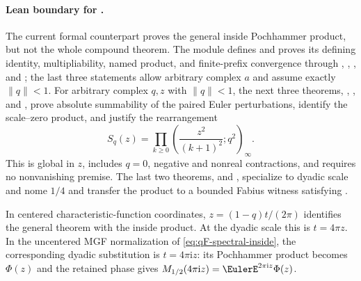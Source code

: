 \documentclass[11pt,a4paper,oneside,openany]{book}
\theoremstyle{definition}
\theoremstyle{remark}
\begin{document}
\paragraph{Lean boundary for .}
The current formal counterpart proves the general inside Pochhammer product,
but not the whole compound theorem.  The module
 defines
 and proves its defining identity,
multipliability, named product, and finite-prefix convergence through
,
,
, and
; the last three statements allow
arbitrary complex $a$ and assume exactly $\lVert q\rVert<1$.
For arbitrary complex $q,z$ with $\lVert q\rVert<1$, the next three theorems,
,
, and
, prove absolute
summability of the paired Euler perturbations, identify the scale--zero
product, and justify the rearrangement
\[
 S_q(z)=\prod_{k\ge0}
 \left(\frac{z^2}{(k+1)^2};q^2\right)_{\!\infty}.
\]
This is global in $z$, includes $q=0$, negative and nonreal contractions, and
requires no nonvanishing premise.  The last two theorems,
 and
, specialize to dyadic
scale and nome $1/4$ and transfer the product to a bounded Fabius witness
satisfying .

In centered characteristic-function coordinates,
$z=(1-q)t/(2\pi)$ identifies the general theorem with the inside product.
At the dyadic scale this is $t=4\pi z$.  In the uncentered MGF normalization
of \eqref{eq:qF-spectral-inside}, the corresponding dyadic substitution is
$t=4\pi\mathrm i z$: its Pochhammer product becomes $\Phi(z)$ and the retained
phase gives $M_{1/2}(4\pi\mathrm i z)=\EulerE^{2\pi\mathrm i z}\Phi(z)$.
\end{document}
